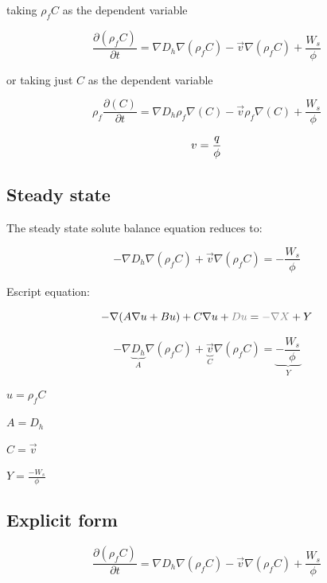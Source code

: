 \documentclass[11pt]{article}
\begin{document}
taking $\rho_f C$ as the dependent variable

\begin{equation}
	\frac{\partial (\rho_f C)}{\partial t} = \nabla D_h \nabla ( \rho_f C) - \vec{v} \nabla ( \rho_f C) + \frac{W_s}{\phi}	
\end{equation}

or taking just $C$ as the dependent variable

\begin{equation}
	\rho_f \frac{\partial (C)}{\partial t} = \nabla D_h \rho_f \nabla (  C) - \vec{v} \rho_f \nabla (  C) + \frac{W_s}{\phi}	
\end{equation}
 
\begin{equation}
    v = {q \over{\phi} }
\end{equation}



\subsection{Steady state}

The steady state solute balance equation reduces to: 

\begin{equation}
	- \nabla D_h \nabla ( \rho_f C) + \vec{v} \nabla ( \rho_f C) = - \frac{W_s}{\phi}	
\end{equation}

Escript equation:

\begin{equation}
    - \nabla (A \nabla u + B u ) + C \nabla u +  {\color{gray} D u } = {\color{gray}- \nabla X } + Y
\end{equation}

\begin{equation}
	- \nabla \underbrace{D_h}_A \nabla ( \rho_f C) + \underbrace{\vec{v}}_C \nabla ( \rho_f C) = \underbrace{- \frac{W_s}{\phi}}_Y	
\end{equation}


$ u = \rho_f C $

$ A = D_h $

$ C = \vec v $

$ Y = \frac{-W_s}{\phi} $


\subsection{Explicit form}


\begin{equation}
	\frac{\partial (\rho_f C)}{\partial t} = \nabla D_h \nabla ( \rho_f C) - \vec{v} \nabla ( \rho_f C) + \frac{W_s}{\phi}	
\end{equation}
\end{document}
